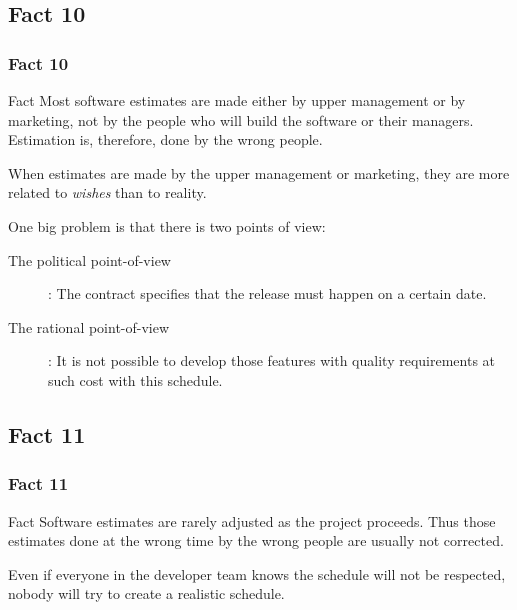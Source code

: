 \documentclass{beamer}
\begin{document}
\subsection{Fact 10}
\begin{frame}
    \frametitle{Fact 10}
    \begin{block}{Fact}
    Most software estimates are made either by upper management or by marketing,
    not by the people who will build the software or their managers. Estimation
    is, therefore, done by the wrong people.
    \end{block}
    \pause

    When estimates are made by the upper management or marketing, they are more
    related to \textit{wishes} than to reality. \newline
    \pause

    One big problem is that there is two points of view:

    \begin{description}
        \item[The political point-of-view]: The contract specifies that the release
        must happen on a certain date.
        \pause
        \item[The rational point-of-view]: It is not possible to develop
        those features with quality requirements at such cost with this schedule.
    \end{description}
\end{frame}

\subsection{Fact 11}
\begin{frame}
    \frametitle{Fact 11}
    \begin{block}{Fact}
    Software estimates are rarely adjusted as the project proceeds. Thus those
    estimates done at the wrong time by the wrong people are usually not
    corrected.
    \end{block}
    \pause

    Even if everyone in the developer team knows the schedule will not be
    respected, nobody will try to create a realistic schedule.
\end{frame}
\end{document}
